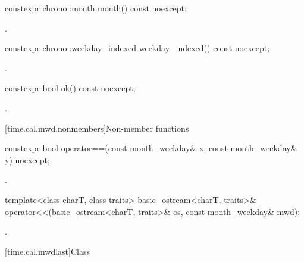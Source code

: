 %
\begin{itemdecl}
constexpr chrono::month month() const noexcept;
\end{itemdecl}

\begin{itemdescr}
\pnum
\returns {}.
\end{itemdescr}

%
\begin{itemdecl}
constexpr chrono::weekday_indexed weekday_indexed() const noexcept;
\end{itemdecl}

\begin{itemdescr}
\pnum
\returns {}.
\end{itemdescr}

%
\begin{itemdecl}
constexpr bool ok() const noexcept;
\end{itemdecl}

\begin{itemdescr}
\pnum
\returns {}.
\end{itemdescr}

[time.cal.mwd.nonmembers]{Non-member functions}

%
\begin{itemdecl}
constexpr bool operator==(const month_weekday& x, const month_weekday& y) noexcept;
\end{itemdecl}

\begin{itemdescr}
\pnum
\returns {}.
\end{itemdescr}

%
\begin{itemdecl}
template<class charT, class traits>
  basic_ostream<charT, traits>&
    operator<<(basic_ostream<charT, traits>& os, const month_weekday& mwd);
\end{itemdecl}

\begin{itemdescr}
\pnum
\returns {}.
\end{itemdescr}

[time.cal.mwdlast]{Class }

